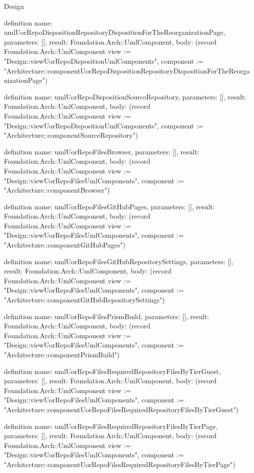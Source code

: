 \begin{lexlean}{Design}
\begin{semanticmodule}
definition{
  name: umlUorRepoDispositionRepositoryDispositionForTheReorganizationPage,
  parameters: [],
  result: Foundation.Arch::UmlComponent,
  body: (record Foundation.Arch::UmlComponent {view := "Design::viewUorRepoDispositionUmlComponents", component := "Architecture::componentUorRepoDispositionRepositoryDispositionForTheReorganizationPage"})
}

definition{
  name: umlUorRepoDispositionSourceRepository,
  parameters: [],
  result: Foundation.Arch::UmlComponent,
  body: (record Foundation.Arch::UmlComponent {view := "Design::viewUorRepoDispositionUmlComponents", component := "Architecture::componentSourceRepository"})
}

definition{
  name: umlUorRepoFilesBrowser,
  parameters: [],
  result: Foundation.Arch::UmlComponent,
  body: (record Foundation.Arch::UmlComponent {view := "Design::viewUorRepoFilesUmlComponents", component := "Architecture::componentBrowser"})
}

definition{
  name: umlUorRepoFilesGitHubPages,
  parameters: [],
  result: Foundation.Arch::UmlComponent,
  body: (record Foundation.Arch::UmlComponent {view := "Design::viewUorRepoFilesUmlComponents", component := "Architecture::componentGitHubPages"})
}

definition{
  name: umlUorRepoFilesGitHubRepositorySettings,
  parameters: [],
  result: Foundation.Arch::UmlComponent,
  body: (record Foundation.Arch::UmlComponent {view := "Design::viewUorRepoFilesUmlComponents", component := "Architecture::componentGitHubRepositorySettings"})
}

definition{
  name: umlUorRepoFilesPrismBuild,
  parameters: [],
  result: Foundation.Arch::UmlComponent,
  body: (record Foundation.Arch::UmlComponent {view := "Design::viewUorRepoFilesUmlComponents", component := "Architecture::componentPrismBuild"})
}

definition{
  name: umlUorRepoFilesRequiredRepositoryFilesByTierGuest,
  parameters: [],
  result: Foundation.Arch::UmlComponent,
  body: (record Foundation.Arch::UmlComponent {view := "Design::viewUorRepoFilesUmlComponents", component := "Architecture::componentUorRepoFilesRequiredRepositoryFilesByTierGuest"})
}

definition{
  name: umlUorRepoFilesRequiredRepositoryFilesByTierPage,
  parameters: [],
  result: Foundation.Arch::UmlComponent,
  body: (record Foundation.Arch::UmlComponent {view := "Design::viewUorRepoFilesUmlComponents", component := "Architecture::componentUorRepoFilesRequiredRepositoryFilesByTierPage"})
}


\end{semanticmodule}
\end{lexlean}
